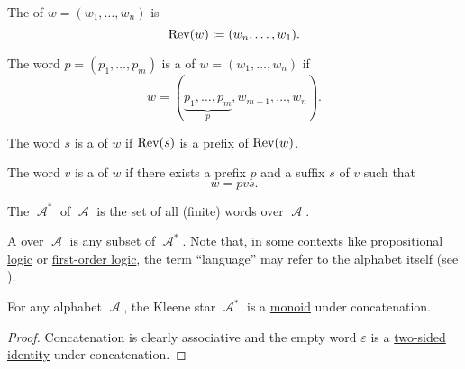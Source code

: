 \begin{definition}
\begin{DefEnum}
     The  of \( w = (w_1, \ldots, w_n) \) is
    \begin{equation*}
      \operatorname{Rev}(w) \coloneqq (w_n, \ldots, w_1).
    \end{equation*}

     The word \( p = (p_1, \ldots, p_m) \) is a  of \( w = (w_1, \ldots, w_n) \) if
    \begin{equation*}
      w = (\underbrace{p_1, \ldots, p_m}_p, w_{m+1}, \ldots, w_n).
    \end{equation*}

     The word \( s \) is a  of \( w \) if \( \operatorname{Rev}(s) \) is a prefix of \( \operatorname{Rev}(w) \).

     The word \( v \) is a  of \( w \) if there exists a prefix \( p \) and a suffix \( s \) of \( v \) such that
    \begin{equation*}
      w = pvs.
    \end{equation*}

     The  \( \mscrA^{\ast} \) of \( \mscrA \) is the set of all (finite) words over \( \mscrA \).

     A  over \( \mscrA \) is any subset of \( \mscrA^{\ast} \). Note that, in some contexts like \hyperref[subsec:language_of_propositional_logic]{propositional logic} or \hyperref[subsec:language_of_first_order_logic]{first-order logic}, the term \enquote{language} may refer to the alphabet itself (see ).
  \end{DefEnum}
\end{definition}

\begin{proposition}\label{thm:kleene_star_is_monoid}
  For any alphabet \( \mscrA \), the Kleene star \( \mscrA^{\ast} \) is a \hyperref[def:unital_magma/associative]{monoid} under concatenation.
\end{proposition}
\begin{proof}
  Concatenation is clearly associative and the empty word \( \varepsilon \) is a \hyperref[def:magma_identity]{two-sided identity} under concatenation.
\end{proof}
